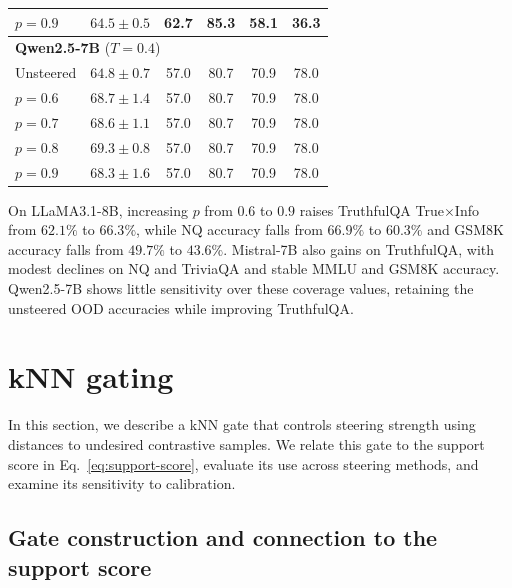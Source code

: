 \begin{table}[ht]
\begin{tabular}{lccccc}
$p=0.9$ & $64.5\pm0.5$ & 62.7 & 85.3 & 58.1 & 36.3 \\
\midrule
\multicolumn{6}{l}{\textbf{Qwen2.5-7B} ($T=0.4$)} \\
\addlinespace[2pt]
Unsteered & $64.8\pm0.7$ & 57.0 & 80.7 & 70.9 & 78.0 \\
$p=0.6$ & $68.7\pm1.4$ & 57.0 & 80.7 & 70.9 & 78.0 \\
$p=0.7$ & $68.6\pm1.1$ & 57.0 & 80.7 & 70.9 & 78.0 \\
$p=0.8$ & $69.3\pm0.8$ & 57.0 & 80.7 & 70.9 & 78.0 \\
$p=0.9$ & $68.3\pm1.6$ & 57.0 & 80.7 & 70.9 & 78.0 \\
\bottomrule
\end{tabular}
\end{table}


On LLaMA3.1-8B, increasing $p$ from $0.6$ to $0.9$ raises TruthfulQA True$\times$Info from $62.1\%$ to $66.3\%$, while NQ accuracy falls from $66.9\%$ to $60.3\%$ and GSM8K accuracy falls from $49.7\%$ to $43.6\%$. Mistral-7B also gains on TruthfulQA, with modest declines on NQ and TriviaQA and stable MMLU and GSM8K accuracy. Qwen2.5-7B shows little sensitivity over these coverage values, retaining the unsteered OOD accuracies while improving TruthfulQA. 

\section{kNN gating}
\label{apx:knn}

In this section, we describe a kNN gate that controls steering strength using distances to undesired contrastive samples. We relate this gate to the support score in Eq.~\eqref{eq:support-score}, evaluate its use across steering methods, and examine its sensitivity to calibration.

\subsection{Gate construction and connection to the support score}
\label{apx:knn-gate}

